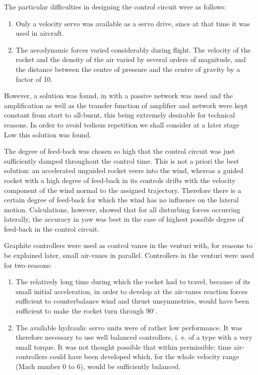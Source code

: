 \documentclass[11pt, a4paper]{article}
\begin{document}
The particular difficulties in designing the control circuit were as follows:

\begin{enumerate}
  \item Only a velocity servo was available as a servo drive, since at that time it was used in aircraft.
  \item The aerodynamic forces varied considerably during flight. The velocity of the rocket and the density of the air varied by several orders of magnitude, and the distance between the centre of pressure and the centre of gravity by a factor of 10.
\end{enumerate}

However, a solution was found, in with a passive network was used and the amplification as well as the transfer function of amplifier and network were kept constant from start to all-burnt, this being extremely desirable for technical reasons. In order to avoid tedious repetition we shall consider at a later stage Low this solution was found.

The degree of feed-back was chosen so high that the control circuit was just sufficiently damped throughout the control time. This is not a priori the best solution: an accelerated unguided rocket veers into the wind, whereas a guided rocket with a high degree of feed-back in its controls drifts with the velocity component of the wind normal to the assigned trajectory. Therefore there is a certain degree of feed-back for which the wind has no influence on the lateral motion. Calculations, however, showed that for all disturbing forces occurring laterally, the accuracy in yaw was best in the case of highest possible degree of feed-back in the control circuit.

Graphite controllers were used as control vanes in the venturi with, for reasons to be explained later, small air-vanes in parallel. Controllers in the venturi were used for two reasons:

\begin{enumerate}
  \item The relatively long time during which the rocket had to travel, because of its small initial acceleration, in order to develop at the air-vanes reaction forces sufficient to counterbalance wind and thrust unsymmetries, would have been sufficient to make the rocket turn through 90$^\circ$.
  \item The available hydraulic servo units were of rather low performance. It was therefore necessary to use well balanced controllers, i. e. of a type with a very small torque. It was not thought possible that within permissible: time air-controllers could have been developed which, for the whole velocity range (Mach number 0 to 6), would be sufficiently balanced.
\end{enumerate}
\end{document}
